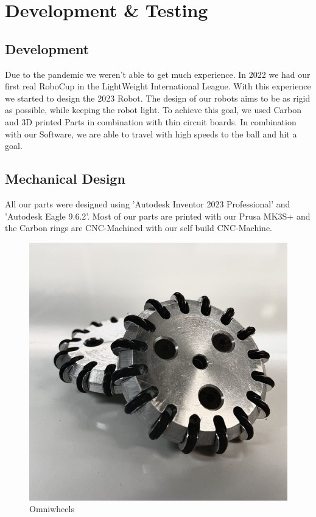 \documentclass{scrartcl}
\begin{document}
\section{Development \& Testing}

\subsection{Development}
Due to the pandemic we weren't able to get much experience. In 2022 we had our first real RoboCup
in the LightWeight International League. With this experience we started to design the 2023 Robot.
\newline
The design of our robots aims to be as rigid as possible, while keeping the robot light.
To achieve this goal, we used Carbon and 3D printed Parts in combination with thin circuit boards.
In combination with our Software, we are able to travel with high speeds to the ball and
hit a goal.

\subsection{Mechanical Design}
All our parts were designed using 'Autodesk Inventor 2023 Professional' and 'Autodesk Eagle 9.6.2'.
Most of our parts are printed with our Prusa MK3S+ and the Carbon rings are CNC-Machined
with our self build CNC-Machine.
\newline
\newline

\begin{figure}
    \centering
    \includegraphics[width=1\linewidth]{img/inv/OmniWheel.jpg}
    \caption{Omniwheels}
    \label{fig:OmniWheels}
\end{figure}
\end{document}
